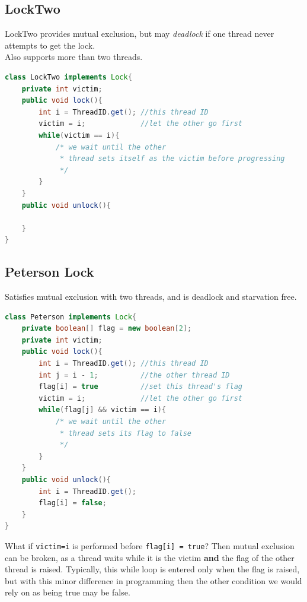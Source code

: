 \documentclass{article}
\begin{document}
\subsection{LockTwo}
LockTwo provides mutual exclusion, but may \textit{deadlock} if one thread never attempts to get the lock.
\\Also supports more than two threads.
\begin{lstlisting}[language=Java]
class LockTwo implements Lock{
    private int victim;
    public void lock(){
        int i = ThreadID.get(); //this thread ID
        victim = i;             //let the other go first
        while(victim == i){
            /* we wait until the other
             * thread sets itself as the victim before progressing
             */
        } 
    }
    public void unlock(){
        
    }
}
\end{lstlisting}

\subsection{Peterson Lock}
Satisfies mutual exclusion with two threads, and is deadlock and starvation free.
\begin{lstlisting}[language=Java]
class Peterson implements Lock{
    private boolean[] flag = new boolean[2];
    private int victim;
    public void lock(){
        int i = ThreadID.get(); //this thread ID
        int j = i - 1;          //the other thread ID
        flag[i] = true          //set this thread's flag
        victim = i;             //let the other go first
        while(flag[j] && victim == i){
            /* we wait until the other
             * thread sets its flag to false
             */
        } 
    }
    public void unlock(){
        int i = ThreadID.get();
        flag[i] = false;
    }
}
\end{lstlisting}
What if \verb|victim=i| is performed before \verb|flag[i] = true|?
\bigbreak Then mutual exclusion can be broken, as a thread waits while it is the victim \textbf{and} the flag of the other thread is raised. Typically, this while loop is entered only when the flag is raised, but with this minor difference in programming then the other condition we would rely on as being true may be false.
\end{document}
